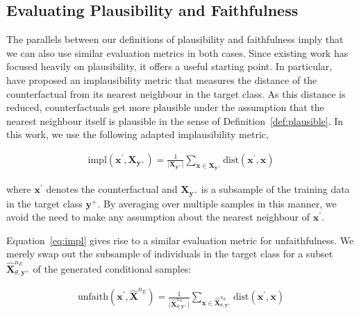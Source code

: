 \documentclass{article}
\begin{document}
\subsection{Evaluating Plausibility and Faithfulness}

The parallels between our definitions of plausibility and faithfulness imply that we can also use similar evaluation metrics in both cases. Since existing work has focused heavily on plausibility, it offers a useful starting point. In particular,~\citet{guidotti2022counterfactual} have proposed an implausibility metric that measures the distance of the counterfactual from its nearest neighbour in the target class. As this distance is reduced, counterfactuals get more plausible under the assumption that the nearest neighbour itself is plausible in the sense of Definition~\ref{def:plausible}. In this work, we use the following adapted implausibility metric,

\begin{equation}\label{eq:impl}
  \begin{aligned}
    \text{impl}(\mathbf{x}^{\prime},\mathbf{X}_{\mathbf{y}^+}) = \frac{1}{\lvert\mathbf{X}_{\mathbf{y}^+}\rvert} \sum_{\mathbf{x} \in \mathbf{X}_{\mathbf{y}^+}} \text{dist}(\mathbf{x}^{\prime},\mathbf{x})
  \end{aligned}
\end{equation}

where $\mathbf{x}^{\prime}$ denotes the counterfactual and $\mathbf{X}_{\mathbf{y}^+}$ is a subsample of the training data in the target class $\mathbf{y}^+$. By averaging over multiple samples in this manner, we avoid the need to make any assumption about the nearest neighbour of $\mathbf{x}^{\prime}$.

Equation~\ref{eq:impl} gives rise to a similar evaluation metric for unfaithfulness. We merely swap out the subsample of individuals in the target class for a subset $\hat{\mathbf{X}}^{n_E}_{\theta,\mathbf{y}^+}$ of the generated conditional samples:

\begin{equation}\label{eq:faith}
  \begin{aligned}
    \text{unfaith}(\mathbf{x}^{\prime},\hat{\mathbf{X}}^{n_E}) = \frac{1}{\lvert \hat{\mathbf{X}}^{n_E}_{\theta,\mathbf{y}^+}\rvert} \sum_{\mathbf{x} \in \hat{\mathbf{X}}^{n_E}_{\theta,\mathbf{y}^+}} \text{dist}(\mathbf{x}^{\prime},\mathbf{x})
  \end{aligned}
\end{equation}
\end{document}
